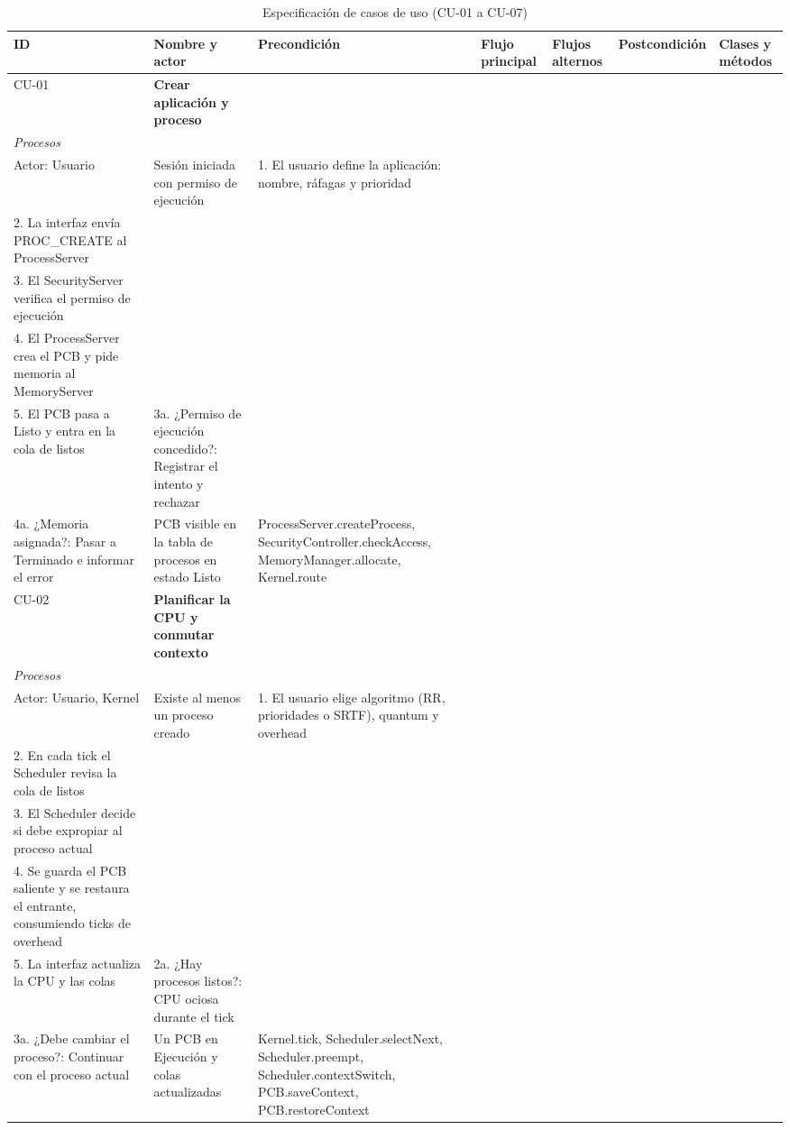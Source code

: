 \documentclass[conference]{IEEEtran}
\begin{document}
\begin{table}[!t]
\caption{Especificación de casos de uso (CU-01 a CU-07)}
\label{tab:cu1}
\scriptsize\renewcommand{\arraystretch}{1.05}\setlength{\tabcolsep}{2pt}
\begin{tabular}{|>{\raggedright}p{0.8cm}|>{\raggedright}p{2.1cm}|>{\raggedright}p{1.7cm}|>{\raggedright}p{4.7cm}|>{\raggedright}p{2.9cm}|>{\raggedright}p{1.8cm}|>{\raggedright}p{2.9cm}|}
\hline
\textbf{ID} & \textbf{Nombre y actor} & \textbf{Precondición} & \textbf{Flujo principal} & \textbf{Flujos alternos} & \textbf{Postcondición} & \textbf{Clases y métodos}\tabularnewline \hline
CU-01 & \textbf{Crear aplicación y proceso}\\ \textit{Procesos}\\ Actor: Usuario & Sesión iniciada con permiso de ejecución & 1. El usuario define la aplicación: nombre, ráfagas y prioridad\\ 2. La interfaz envía PROC\_CREATE al ProcessServer\\ 3. El SecurityServer verifica el permiso de ejecución\\ 4. El ProcessServer crea el PCB y pide memoria al MemoryServer\\ 5. El PCB pasa a Listo y entra en la cola de listos & 3a. ¿Permiso de ejecución concedido?: Registrar el intento y rechazar\\ 4a. ¿Memoria asignada?: Pasar a Terminado e informar el error & PCB visible en la tabla de procesos en estado Listo & ProcessServer.\allowbreak createProcess, SecurityController.\allowbreak checkAccess, MemoryManager.\allowbreak allocate, Kernel.\allowbreak route\tabularnewline \hline
CU-02 & \textbf{Planificar la CPU y conmutar contexto}\\ \textit{Procesos}\\ Actor: Usuario, Kernel & Existe al menos un proceso creado & 1. El usuario elige algoritmo (RR, prioridades o SRTF), quantum y overhead\\ 2. En cada tick el Scheduler revisa la cola de listos\\ 3. El Scheduler decide si debe expropiar al proceso actual\\ 4. Se guarda el PCB saliente y se restaura el entrante, consumiendo ticks de overhead\\ 5. La interfaz actualiza la CPU y las colas & 2a. ¿Hay procesos listos?: CPU ociosa durante el tick\\ 3a. ¿Debe cambiar el proceso?: Continuar con el proceso actual & Un PCB en Ejecución y colas actualizadas & Kernel.\allowbreak tick, Scheduler.\allowbreak selectNext, Scheduler.\allowbreak preempt, Scheduler.\allowbreak contextSwitch, PCB.\allowbreak saveContext, PCB.\allowbreak restoreContext\tabularnewline \hline

\end{tabular}
\end{table}
\end{document}
